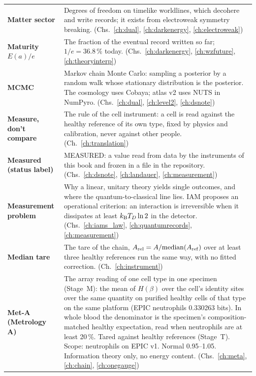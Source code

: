 {\begin{longtable}{@{}>{\raggedright\arraybackslash}p{}>{\raggedright\arraybackslash}p{}@{}}
\textbf{Matter sector} & Degrees of freedom on timelike worldlines, which decohere and write records; it exists from electroweak symmetry breaking. {\footnotesize(Chs.~\ref{ch:dual}, \ref{ch:darkenergy}, \ref{ch:electroweak})}\\[1pt]
\textbf{Maturity $E(a)/e$} & The fraction of the eventual record written so far; $1/e=36.8\,\%$ today. {\footnotesize(Chs.~\ref{ch:darkenergy}, \ref{ch:wzfuture}, \ref{ch:theoryinterp})}\\[1pt]
\textbf{MCMC} & Markov chain Monte Carlo: sampling a posterior by a random walk whose stationary distribution is the posterior. The cosmology uses Cobaya; atlas v2 uses NUTS in NumPyro. {\footnotesize(Chs.~\ref{ch:dual}, \ref{ch:level2}, \ref{ch:dsnote})}\\[1pt]
\textbf{Measure, don't compare} & The rule of the cell instrument: a cell is read against the healthy reference of its own type, fixed by physics and calibration, never against other people. {\footnotesize(Ch.~\ref{ch:translation})}\\[1pt]
\textbf{Measured (status label)} & MEASURED: a value read from data by the instruments of this book and frozen in a file in the repository. {\footnotesize(Chs.~\ref{ch:dsnote}, \ref{ch:landauer}, \ref{ch:measurement})}\\[1pt]
\textbf{Measurement problem} & Why a linear, unitary theory yields single outcomes, and where the quantum-to-classical line lies. IAM proposes an operational criterion: an interaction is irreversible when it dissipates at least $k_{\mathrm B} T_D\ln2$ in the detector. {\footnotesize(Chs.~\ref{ch:iams_law}, \ref{ch:quantumrecords}, \ref{ch:measurement})}\\[1pt]
\textbf{Median tare} & The tare of the chain, $A_{\rm rel}=A/\mathrm{median}(A_{\rm ref})$ over at least three healthy references run the same way, with no fitted correction. {\footnotesize(Ch.~\ref{ch:instrument})}\\[1pt]
\textbf{Met-A (Metrology A)} & The array reading of one cell type in one specimen (Stage~M): the mean of $H(\beta)$ over the cell's identity sites over the same quantity on purified healthy cells of that type on the same platform (EPIC neutrophils 0.330263 bits). In whole blood the denominator is the specimen's composition-matched healthy expectation, read when neutrophils are at least 20\,\%. Tared against healthy references (Stage~T). Scope: neutrophils on EPIC v1. Normal 0.95--1.05. Information theory only, no energy content. {\footnotesize(Chs.~\ref{ch:meta}, \ref{ch:chain}, \ref{ch:onegauge})}\\[1pt]

\end{longtable}}
